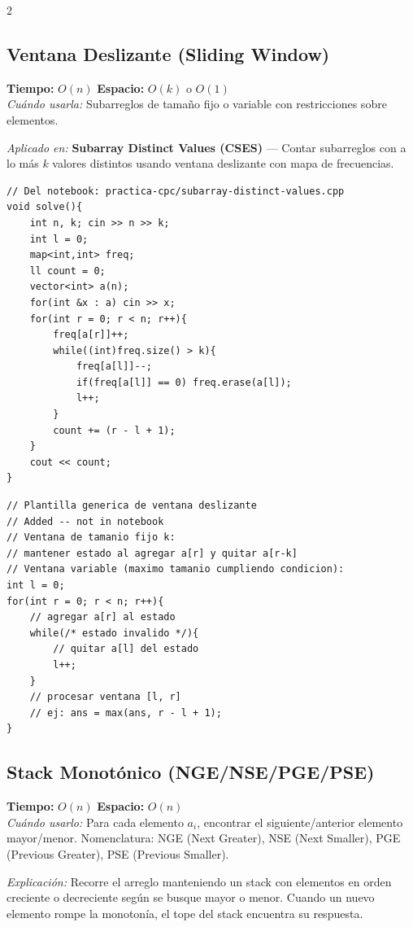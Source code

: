 \documentclass[10pt,a4paper]{article}
\begin{document}
\begin{multicols}{2}
\subsection{Ventana Deslizante (Sliding Window)}
\textbf{Tiempo:} $O(n)$ \quad \textbf{Espacio:} $O(k)$ o $O(1)$\\
\textit{Cu\'ando usarla:} Subarreglos de tama\~no fijo o variable con restricciones sobre elementos.

\textit{Aplicado en:} \textbf{Subarray Distinct Values (CSES)} --- Contar subarreglos con a lo m\'as $k$ valores distintos usando ventana deslizante con mapa de frecuencias.

\begin{lstlisting}
// Del notebook: practica-cpc/subarray-distinct-values.cpp
void solve(){
    int n, k; cin >> n >> k;
    int l = 0;
    map<int,int> freq;
    ll count = 0;
    vector<int> a(n);
    for(int &x : a) cin >> x;
    for(int r = 0; r < n; r++){
        freq[a[r]]++;
        while((int)freq.size() > k){
            freq[a[l]]--;
            if(freq[a[l]] == 0) freq.erase(a[l]);
            l++;
        }
        count += (r - l + 1);
    }
    cout << count;
}
\end{lstlisting}

\begin{lstlisting}
// Plantilla generica de ventana deslizante
// Added -- not in notebook
// Ventana de tamanio fijo k:
// mantener estado al agregar a[r] y quitar a[r-k]
// Ventana variable (maximo tamanio cumpliendo condicion):
int l = 0;
for(int r = 0; r < n; r++){
    // agregar a[r] al estado
    while(/* estado invalido */){
        // quitar a[l] del estado
        l++;
    }
    // procesar ventana [l, r]
    // ej: ans = max(ans, r - l + 1);
}
\end{lstlisting}


\subsection{Stack Monot\'onico (NGE/NSE/PGE/PSE)}
\textbf{Tiempo:} $O(n)$ \quad \textbf{Espacio:} $O(n)$\\
\textit{Cu\'ando usarlo:} Para cada elemento $a_i$, encontrar el siguiente/anterior elemento mayor/menor. Nomenclatura: NGE (Next Greater), NSE (Next Smaller), PGE (Previous Greater), PSE (Previous Smaller).

\textit{Explicaci\'on:} Recorre el arreglo manteniendo un stack con elementos en orden creciente o decreciente seg\'un se busque mayor o menor. Cuando un nuevo elemento rompe la monoton\'ia, el tope del stack encuentra su respuesta.


\end{multicols}
\end{document}
